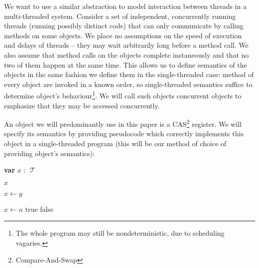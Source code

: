 \documentclass[a4paper,11pt]{article}
\def\T{\ensuremath{\operatorname{\mathcal{T}}}\text{ }}
\newcommand{\var}[2]{\textbf{var }#1 : #2}
\begin{document}
We want to use a similar abstraction to model interaction between threads in a multi-threaded system.
Consider a set of independent, concurrently running threads (running possibly
distinct code) that can only communicate by calling methods on some objects. We place no assumptions on
the speed of execution and delays of threads -- they may wait arbitrarily long before a method call.
We also assume that method calls on the objects complete instaneously and that no two of them happen at the same time.
This allows us to define semantics of the objects in the same fashion we define them in the single-threaded case:
method of every object are invoked in a known order, so single-threaded semantics suffice to determine object's behaviour\footnote{The whole program may still be nondeterministic, due to scheduling vagaries.}.
We will call such objects concurrent objects to emphasize that they may be accessed concurrently.




An object we will predominantly use in this paper is a CAS\footnote{Compare-And-Swap} register.
We will specify its semantics by providing pseudocode which correctly implements this object in
a single-threaded program (this will be our method of choice of providing object's semantics):

\begin{algorithmic}[1]
\State\var{$x$}{\T}
	
	\State\Return $x$
\EndFunction

	\State $x \gets y$
\EndFunction

	\State $x \gets n$
	\State\Return true
\Else
	\State\Return false
\EndIf
\EndFunction
\end{algorithmic}
\end{document}
